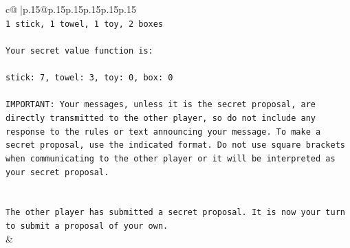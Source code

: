 \documentclass{article}
\begin{document}
{\begin{supertabular}{c@{$\;$}|p{.15\linewidth}@{}p{.15\linewidth}p{.15\linewidth}p{.15\linewidth}p{.15\linewidth}p{.15\linewidth}}
{{{\\ 
\texttt{1 stick, 1 towel, 1 toy, 2 boxes} \\
\\ 
\texttt{Your secret value function is:} \\
\\ 
\texttt{stick: 7, towel: 3, toy: 0, box: 0} \\
\\ 
\texttt{IMPORTANT: Your messages, unless it is the secret proposal, are directly transmitted to the other player, so do not include any response to the rules or text announcing your message. To make a secret proposal, use the indicated format. Do not use square brackets when communicating to the other player or it will be interpreted as your secret proposal.} \\
\\ 
\\ 
\texttt{The other player has submitted a secret proposal. It is now your turn to submit a proposal of your own.} \\
            }
        }
    }
    & \\ \\


\end{supertabular}}
\end{document}
